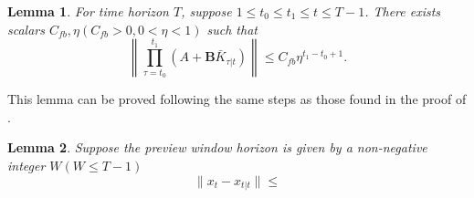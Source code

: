\documentclass{article}
\newtheorem{lemma}{Lemma}
\begin{document}
\begin{lemma}\label{lemma:multGain}
    For time horizon $T$, suppose $1\leq t_{0} \leq t_{1}\leq t\leq T-1$. There exists scalars $C_{fb},\eta(C_{fb}>0,0<\eta<1)$ such that
    \begin{equation}
        \left \| \prod_{\tau=t_{0}}^{t_{1}}(A+\mathbf{B}\bar{K}_{\tau|t})  \right\| \leq C_{fb}\eta^{t_{1}-t_{0}+1}.
    \end{equation}
\end{lemma}
This lemma can be proved following the same steps as those found in the proof of \cite[Appendix E,Proposition 2]{zhang_regret_2021}.
\begin{lemma}
    Suppose the preview window horizon is given by a non-negative integer $W(W \leq T-1)$
    \begin{equation}
        \|x_{t}-x_{t|t}\| \leq 
    \end{equation}
\end{lemma}
\end{document}
